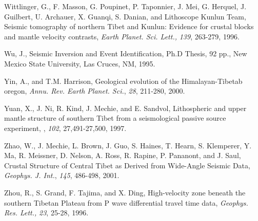 \documentclass[12pt]{article}
\begin{document}
\begin{references}
Wittlinger, G., F. Masson, G. Poupinet, P. Taponnier, J. Mei, G. Herquel,
J. Guilbert, U. Archauer, X. Guanqi, S. Danian, and Lithoscope Kunlun Team,
Seismic tomography of northern Tibet and Kunlun: Evidence for crustal blocks
and mantle velocity contrasts, {\it Earth Planet. Sci. Lett.,} {\it 139},
263-279, 1996.

Wu, J., Seismic Inversion and Event Identification, Ph.D Thesis, 92 pp.,
New Mexico State University, Las Cruces, NM, 1995.

Yin, A., and T.M. Harrison, Geological evolution of the 
Himalayan-Tibetab oregon, {\it Annu. Rev. Earth Planet. Sci.}, {\it 28}, 211-280, 
2000. 

Yuan, X., J. Ni, R. Kind, J. Mechie, and E. Sandvol, Lithospheric
and upper mantle structure of southern Tibet from a seismological passive
source experiment, \jgr, {\it 102}, 27,491-27,500, 1997.

Zhao, W., J. Mechie, L. Brown, J. Guo, S. Haines, T. Hearn, S. Klemperer,
Y. Ma, R. Meissner, D. Nelson, A. Ross, R. Rapine, P. Pananont, and J. Saul,
Crustal Structure of Central Tibet as Derived from Wide-Angle
Seismic Data, {\it Geophys. J. Int.}, {\it 145}, 486-498, 2001.

Zhou, R., S. Grand, F. Tajima, and X. Ding, High-velocity zone 
beneath the southern Tibetan Plateau from P wave differential travel time data,
{\it Geophys. Res. Lett.,} {\it 23}, 25-28, 1996.

\end{references}

\clearpage
\end{document}
